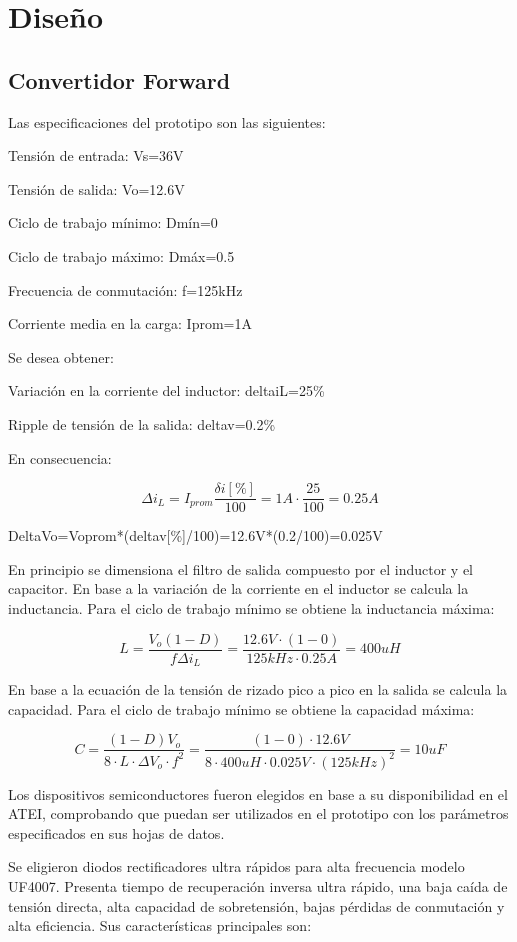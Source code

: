 \section{Diseño}

\subsection{Convertidor Forward}

Las especificaciones del prototipo son las siguientes:

Tensión de entrada: Vs=36V

Tensión de salida: Vo=12.6V

Ciclo de trabajo mínimo: Dmín=0

Ciclo de trabajo máximo: Dmáx=0.5

Frecuencia de conmutación: f=125kHz

Corriente media en la carga: Iprom=1A

Se desea obtener:

Variación en la corriente del inductor: deltaiL=25\%

Ripple de tensión de la salida: deltav=0.2\%

En consecuencia:

$$ \Delta i_L=I_{prom}\frac{\delta i[\%]}{100}=1A\cdot\frac{25}{100}=0.25A $$

DeltaVo=Voprom*(deltav[\%]/100)=12.6V*(0.2/100)=0.025V

En principio se dimensiona el filtro de salida compuesto por el inductor y el capacitor. 
En base a la variación de la corriente en el inductor se calcula la inductancia.
Para el ciclo de trabajo mínimo se obtiene la inductancia máxima:


$$ L=\frac{V_o(1-D)}{f\Delta i_L}=\frac{12.6V\cdot(1-0)}{125kHz\cdot0.25A}=400uH $$

En base a la ecuación de la tensión de rizado pico a pico en la salida se calcula la capacidad.
Para el ciclo de trabajo mínimo se obtiene la capacidad máxima:


$$ C=\frac{(1-D)V_o}{8\cdot L\cdot\Delta V_o\cdot f^2}=\frac{(1-0)\cdot12.6V}{8\cdot400uH\cdot0.025V\cdot(125kHz)^2}=10uF $$

Los dispositivos semiconductores fueron elegidos en base a su disponibilidad en el ATEI,
comprobando que puedan ser utilizados en el prototipo con los parámetros especificados en sus hojas de datos.  

Se eligieron diodos rectificadores ultra rápidos para alta frecuencia modelo UF4007. 
Presenta tiempo de recuperación inversa ultra rápido, una baja caída de tensión directa, alta capacidad de sobretensión, bajas pérdidas de conmutación y alta eficiencia.
Sus características principales son: 

